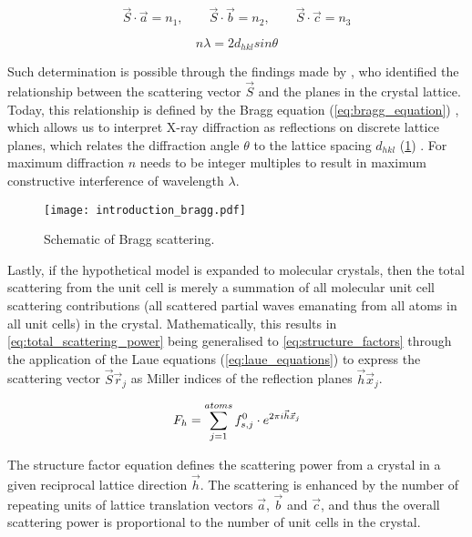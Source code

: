 \begin{equation}
    \vec{S} \cdot \vec{a}=n_1, \quad \quad \vec{S} \cdot \vec{b}=n_2, \quad \quad \vec{S} \cdot \vec{c}=n_3
    \label{eq:laue_equations}
\end{equation}

\begin{equation}
    n\lambda=2d_{hkl}sin\theta
    \label{eq:bragg_equation}
\end{equation}

Such determination is possible through the findings made by \textcite{Bragg1913-cx}, who identified the relationship between the scattering vector $\vec{S}$ and the planes in the crystal lattice. Today, this relationship is defined by the Bragg equation (\cref{eq:bragg_equation}) \cite{Bragg1913-cx}, which allows us to interpret X-ray diffraction as reflections on discrete lattice planes, which relates the diffraction angle $\theta$ to the lattice spacing $d_{hkl}$ (\cref{fig:introduction_bragg}) \cite{Rupp2010-nc}. For maximum diffraction $n$ needs to be integer multiples to result in maximum constructive interference of wavelength $\lambda$.

\begin{figure}[H]
    \centering
    \texttt{[image: introduction\_bragg.pdf]}
    \caption{Schematic of Bragg scattering.}
    \label{fig:introduction_bragg}
\end{figure}

Lastly, if the hypothetical model is expanded to molecular crystals, then the total scattering from the unit cell is merely a summation of all molecular unit cell scattering contributions (all scattered partial waves emanating from all atoms in all unit cells) in the crystal. Mathematically, this results in \cref{eq:total_scattering_power} being generalised to \cref{eq:structure_factors} through the application of the Laue equations (\cref{eq:laue_equations}) to express the scattering vector $\vec{S}\vec{r}_j$ as Miller indices of the reflection planes $\vec{h}\vec{x}_j$. 

\begin{equation}
    F_h=\sum_{j=1}^{atoms}f_{s,j}^0 \cdot e^{2\pi\\i\vec{h}\vec{x}_j}
    \label{eq:structure_factors}
\end{equation}

The structure factor equation defines the scattering power from a crystal in a given reciprocal lattice direction $\vec{h}$. The scattering is enhanced by the number of repeating units of lattice translation vectors $\vec{a}$, $\vec{b}$ and $\vec{c}$, and thus the overall scattering power is proportional to the number of unit cells in the crystal.

